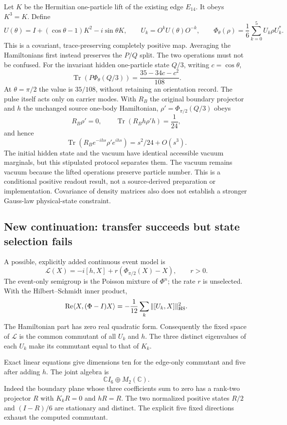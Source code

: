 Let $K$ be the Hermitian one-particle lift of the existing edge $E_{14}$.
It obeys $K^3=K$. Define
\[
 U(\theta)=I+(\cos\theta-1)K^2-i\sin\theta K,\qquad
 U_k=O^kU(\theta)O^{-k},\qquad
 \Phi_\theta(\rho)=\frac16\sum_{k=0}^5U_k\rho U_k^*.
\]
This is a covariant, trace-preserving completely positive map. Averaging
the Hamiltonians first instead preserves the $P/Q$ split. The two operations
must not be confused. For the invariant hidden one-particle state $Q/3$,
writing $c=\cos\theta$,
\[
 \operatorname{Tr}(P\Phi_\theta(Q/3))
 =\frac{35-34c-c^2}{108}.
\]
At $\theta=\pi/2$ the value is $35/108$, without retaining an orientation
record. The pulse itself acts only on carrier modes. With $R_B$ the
original boundary projector and $h$ the unchanged source one-body
Hamiltonian, $\rho'=\Phi_{\pi/2}(Q/3)$ obeys
\[
 R_B\rho'=0,\qquad
 \operatorname{Tr}(R_Bh\rho'h)=\frac1{24},
\]
and hence
\[
 \operatorname{Tr}(R_Be^{-ihs}\rho'e^{ihs})
 =s^2/24+O(s^3).
\]
The initial hidden state and the vacuum have identical accessible vacuum
marginals, but this stipulated protocol separates them. The vacuum remains
vacuum because the lifted operations preserve particle number. This is a
conditional positive readout result, not a source-derived preparation or
implementation. Covariance of density matrices also does not establish
a stronger Gauss-law physical-state constraint.

\subsection{New continuation: transfer succeeds but state selection fails}

A possible, explicitly added continuous event model is
\[
 \mathcal L(X)=-i[h,X]+r(\Phi_{\pi/2}(X)-X),\qquad r>0.
\]
The event-only semigroup is the Poisson mixture of $\Phi^n$; the rate $r$
is unselected. With the Hilbert--Schmidt inner product,
\[
 \operatorname{Re}\langle X,(\Phi-I)X\rangle
 =-\frac1{12}\sum_k\|[U_k,X]\|_{\rm HS}^2.
\]
The Hamiltonian part has zero real quadratic form. Consequently the fixed
space of $\mathcal L$ is the common commutant of all $U_k$ and $h$.
The three distinct eigenvalues of each $U_k$ make its commutant equal to
that of $K_k$.

Exact linear equations give dimensions ten for the edge-only commutant
and five after adding $h$. The joint algebra is
\[
 \mathbb C I_6\oplus M_2(\mathbb C).
\]
Indeed the boundary plane whose three coefficients sum to zero has a
rank-two projector $R$ with $K_kR=0$ and $hR=R$. The two normalized positive
states $R/2$ and $(I-R)/6$ are stationary and distinct. The explicit five
fixed directions exhaust the computed commutant.

